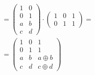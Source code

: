\documentclass[
]{article}
\begin{document}
\[\begin{array}{l}
{= {\begin{pmatrix}
1 & 0 \\
0 & 1 \\
a & b \\
c & d
\end{pmatrix} \cdot \begin{pmatrix}
1 & 0 & 1 \\
0 & 1 & 1
\end{pmatrix}} =} \\
{= \begin{pmatrix}
1 & 0 & 1 \\
0 & 1 & 1 \\
a & b & {a\oplus b} \\
c & d & {c\oplus d}
\end{pmatrix}}
\end{array}\]
\end{document}
